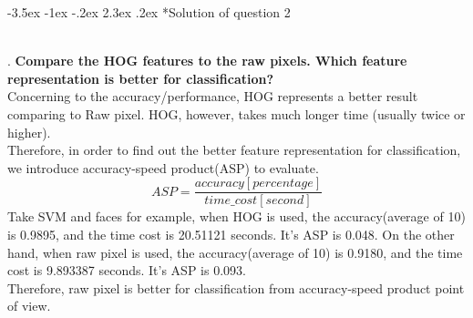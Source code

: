 \documentclass[12pt]{article}
\makeatletter
\renewcommand\section{\@startsection {section}{1}{\z@}%
	{-3.5ex \@plus -1ex \@minus -.2ex}%
	{2.3ex \@plus.2ex}%
	{\normalfont\large\bfseries}}%
\makeatother
\begin{document}
	\section*{Solution of question 2}
	\noindent
	\\
	. \textbf{Compare the HOG features to the raw pixels. Which feature representation	is better for classification?}\\
	Concerning to the accuracy/performance, HOG represents a better result comparing to Raw pixel. HOG, however, takes much longer time (usually twice or higher).\\
	Therefore, in order to find out the better feature representation for classification, we introduce accuracy-speed product(ASP) to evaluate.\\
	$$ASP = \frac{accuracy[percentage]}{time\_cost[second]}$$
	Take SVM and faces for example, when HOG is used, the accuracy(average of 10) is  0.9895, and the time cost is 20.51121 seconds. It's ASP is 0.048. On the other hand, when raw pixel is used, the accuracy(average of 10) is 0.9180, and the time cost is 9.893387 seconds. It's ASP is 0.093.\\
	Therefore, raw pixel is better for classification from accuracy-speed product point of view.\\
\end{document}
